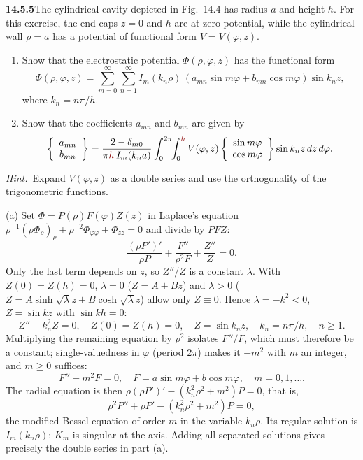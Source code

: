\par\bigskip
\noindent\textbf{14.5.5}\quad The cylindrical cavity depicted in
Fig.~14.4 has radius $a$ and height $h$. For this exercise, the end
caps $z=0$ and $h$ are at zero potential, while the cylindrical wall
$\rho=a$ has a potential of functional form $V=V(\varphi,z)$.
\begin{enumerate}
\item[(a)] Show that the electrostatic potential
$\Phi(\rho,\varphi,z)$ has the functional form
\[
\Phi(\rho,\varphi,z)=\sum_{m=0}^{\infty}\sum_{n=1}^{\infty}
I_{m}(k_{n}\rho)\,(a_{mn}\sin m\varphi+b_{mn}\cos m\varphi)\sin k_{n}z,
\]
where $k_{n}=n\pi/h$.
\item[(b)] Show that the coefficients $a_{mn}$ and $b_{mn}$ are given by
\[
\left\{\begin{array}{c}a_{mn}\\b_{mn}\end{array}\right\}
=\frac{2-\delta_{m0}}{\pi \erratum{h}\,I_{m}(k_{n}a)}
\int_{0}^{2\pi}\!\!\int_{0}^{\erratum{h}}V(\varphi,z)
\left\{\begin{array}{c}\sin m\varphi\\\cos m\varphi\end{array}\right\}
\sin k_{n}z\,dz\,d\varphi.
\]
\end{enumerate}
\par\emph{Hint.}~Expand $V(\varphi,z)$ as a double series and use the
orthogonality of the trigonometric functions.
\par{}
\solution
(a) Set $\Phi=P(\rho)F(\varphi)Z(z)$ in Laplace's equation
$\rho^{-1}(\rho\Phi_\rho)_\rho+\rho^{-2}\Phi_{\varphi\varphi}
+\Phi_{zz}=0$ and divide by $PFZ$:
\[
\frac{(\rho P')'}{\rho P}+\frac{F''}{\rho^2F}+\frac{Z''}{Z}=0.
\]
Only the last term depends on $z$, so $Z''/Z$ is a constant
$\lambda$. With $Z(0)=Z(h)=0$, $\lambda=0$ ($Z=A+Bz$) and
$\lambda>0$ ($Z=A\sinh\sqrt\lambda z+B\cosh\sqrt\lambda z$) allow
only $Z\equiv0$. Hence $\lambda=-k^2<0$, $Z=\sin kz$ with
$\sin kh=0$:
\[
Z''+k_n^2Z=0,\quad Z(0)=Z(h)=0,
\quad Z=\sin k_nz,\quad k_n=n\pi/h,
\quad n\ge1.
\]
Multiplying the remaining equation by $\rho^2$ isolates $F''/F$,
which must therefore be a constant; single-valuedness in $\varphi$
(period $2\pi$) makes it $-m^2$ with $m$ an integer, and $m\ge0$
suffices:
\[
F''+m^2F=0,\quad F= a\sin m\varphi+b\cos m\varphi,
\quad m=0,1,\ldots.
\]
The radial equation is then $\rho(\rho P')'-(k_n^2\rho^2+m^2)P=0$,
that is,
\[
\rho^2P''+\rho P'-(k_n^2\rho^2+m^2)P=0,
\]
the modified Bessel equation of order $m$ in the variable
$k_n\rho$. Its regular solution is $I_m(k_n\rho)$; $K_m$ is
singular at the axis. Adding all separated solutions gives
precisely the double series in part (a).


